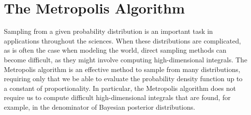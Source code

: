 
\section*{The Metropolis Algorithm}
Sampling from a given probability distribution is an important task in applications throughout the sciences.
When these distributions are complicated, as is often the case when modeling the world, direct sampling methods
can become difficult, as they might involve computing high-dimensional integrals.
The Metropolis algorithm is an effective method to sample from many distributions, requiring only that we
be able to evaluate the probability density function up to a constant of proportionality. In particular,
the Metropolis algorithm does not require us to compute difficult high-dimensional integrals that are found,
for example, in the denominator of Bayesian posterior distributions.

